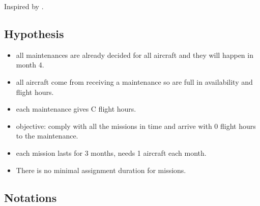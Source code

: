 \documentclass[a4paper,11pt]{article}
\begin{document}
    Inspired by \cite{Caprara2003}.

    \subsection{Hypothesis}

    \begin{itemize}
     \item all maintenances are already decided for all aircraft and they will happen in month 4.
     \item all aircraft come from receiving a maintenance so are full in availability and flight hours.
     \item each maintenance gives C flight hours.
     \item objective: comply with all the missions in time and arrive with 0 flight hours to the maintenance.
     \item each mission lasts for 3 months, needs 1 aircraft each month.
     \item There is no minimal assignment duration for missions.
    \end{itemize}





    \subsection{Notations}
\end{document}
